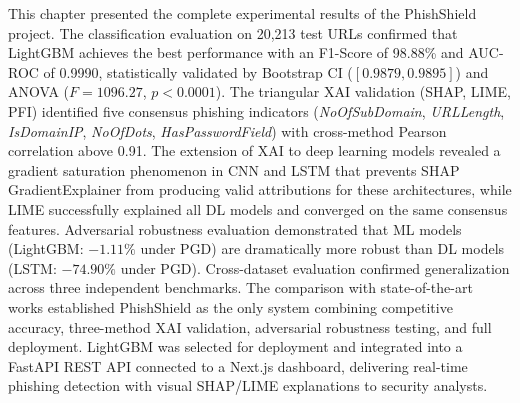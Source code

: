 This chapter presented the complete experimental results of the PhishShield project. The classification evaluation on 20,213 test URLs confirmed that LightGBM achieves the best performance with an F1-Score of 98.88\% and AUC-ROC of 0.9990, statistically validated by Bootstrap CI ($[0.9879, 0.9895]$) and ANOVA ($F = 1096.27$, $p < 0.0001$). The triangular XAI validation (SHAP, LIME, PFI) identified five consensus phishing indicators (\textit{NoOfSubDomain}, \textit{URLLength}, \textit{IsDomainIP}, \textit{NoOfDots}, \textit{HasPasswordField}) with cross-method Pearson correlation above 0.91. The extension of XAI to deep learning models revealed a gradient saturation phenomenon in CNN and LSTM that prevents SHAP GradientExplainer from producing valid attributions for these architectures, while LIME successfully explained all DL models and converged on the same consensus features. Adversarial robustness evaluation demonstrated that ML models (LightGBM: $-1.11\%$ under PGD) are dramatically more robust than DL models (LSTM: $-74.90\%$ under PGD). Cross-dataset evaluation confirmed generalization across three independent benchmarks. The comparison with state-of-the-art works established PhishShield as the only system combining competitive accuracy, three-method XAI validation, adversarial robustness testing, and full deployment. LightGBM was selected for deployment and integrated into a FastAPI REST API connected to a Next.js dashboard, delivering real-time phishing detection with visual SHAP/LIME explanations to security analysts.
